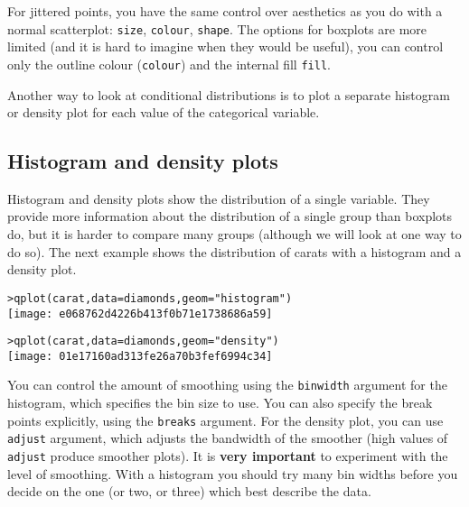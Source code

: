 % 
For jittered points, you have the same control over aesthetics as you do with a normal scatterplot: {\tt size}, {\tt colour}, {\tt shape}.  The options for boxplots are more limited (and it is hard to imagine when they would be useful), you can control only the outline colour ({\tt colour}) and the internal fill {\tt fill}.

Another way to look at conditional distributions is to plot a separate histogram or density plot for each value of the categorical variable.

\subsection{Histogram and density plots}\label{sub:density}

Histogram and density plots show the distribution of a single variable.  They provide more information about the distribution of a single group than boxplots do, but it is harder to compare many groups (although we will look at one way to do so).  The next example shows the distribution of carats with a histogram and a density plot.

\begin{alltt}
> qplot(carat, data = diamonds, geom = "histogram")
\texttt{[image: e068762d4226b413f0b71e1738686a59]}

> qplot(carat, data = diamonds, geom = "density")
\texttt{[image: 01e17160ad313fe26a70b3fef6994c34]}

\end{alltt}

You can control the amount of smoothing using the {\tt binwidth} argument for the histogram, which specifies the bin size to use.  You can also specify the break points explicitly, using the {\tt breaks} argument.  For the density plot, you can use {\tt adjust} argument, which adjusts the bandwidth of the smoother (high values of {\tt adjust} produce smoother plots).  It is {\bf very important} to experiment with the level of smoothing.  With a histogram you should try many bin widths before you decide on the one (or two, or three) which best describe the data.

